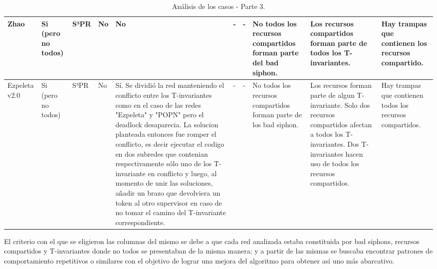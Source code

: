 \begin{landscape}
\begin{table}[H]
\begin{tabular}{|p{1cm}|p{1.5cm}|p{0.7cm}|p{1cm}|p{4.5cm}|p{1.2cm}|p{3.2cm}|p{2cm}|p{2cm}|p{1.6cm}|}
    Zhao & Si (pero no todos) & S³PR & No & No & - & - & No todos los recursos compartidos forman parte del bad siphon. & Los recursos compartidos forman parte de todos los T-invariantes. & Hay trampas que contienen los recursos compartido. \\
    \hline
    
    Ezpeleta v2.0 & Si (pero no todos) & S³PR & No & Sí. Se dividió la red manteniendo el conflicto entre los T-invariantes como en el caso de las redes "Ezpeleta" y "POPN" pero el deadlock desaparecia. La solucion planteada entonces fue romper el conflicto, es decir ejecutar el codigo en dos subredes que contenian respectivamente sólo uno de los T-invariante en conflicto y luego, al momento de unir las soluciones, añadir un brazo que devolviera un token al otro supervisor en caso de no tomar el camino del T-invariante correspondiente. & - & - & No todos los recursos compartidos forman parte de los bad siphon. & Los recursos forman parte de algun T-invariante. Solo dos recursos compartidos afectan a todos los T-invariantes. Dos T-invariantes hacen uso de todos los recursos compartidos. & Hay trampas que contienen todos los recursos compartidos. \\
    \hline
    
    \end{tabular}
    \caption{Análisis de los casos - Parte 3.}
    \label{tab:Analisis-Casos3}
\end{table}
\end{landscape}

\newpage
El criterio con el que se eligieron las columnas del mismo se debe a que cada red analizada estaba constituida por bad siphons, recursos compartidos y T-invariantes donde no todos se presentaban de la misma manera; y a partir de las mismas se buscaba encontrar patrones de comportamiento repetitivos o similares con el objetivo de lograr una mejora del algoritmo para obtener así uno más abarcativo.\\

